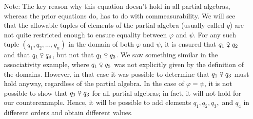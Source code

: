 \documentclass{scrartcl}
\renewcommand{\phi}{\varphi}
\newcommand{\com}{\mathrel{\venus}}
\begin{document}
\begin{examples}
\begin{enumerate}[(1)]
Note: The key reason why this equation doesn't hold in all partial algebras, whereas the prior equations do, has to do with commeasurability. We will see that the allowable tuples of elements of the partial algebra (usually called $\bar{q}$) are not quite restricted enough to ensure equality between $\phi$ and $\psi$. For any such tuple $(q_1,q_2,\ldots,q_n)$ in the domain of both $\phi$ and $\psi$, it is ensured that $q_1\com q_2$ and that $q_1\com q_4$, but not that $q_1\com q_3$. We saw something similar in the associativity example, where $q_1\com q_3$ was not explicitly given by the definition of the domains. However, in that case it was possible to determine that $q_1\com q_3$ must hold anyway, regardless of the partial algebra. In the case of $\phi=\psi$, it is not possible to show that $q_1\com q_3$ for all partial algebras; in fact, it will not hold for our counterexample. Hence, it will be possible to add elements $q_1,q_2,q_3,$ and $q_4$ in different orders and obtain different values.


\end{enumerate}
\end{examples}
\end{document}
